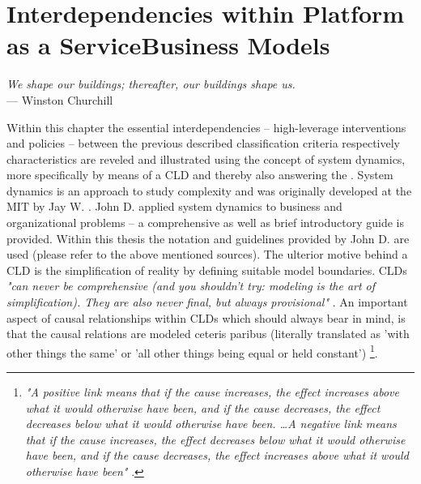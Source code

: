 \chapter[Interdependencies within Platform as a Service Business Models]{Interdependencies within Platform as a Service\protect\linebreak Business Models}\label{ch:cld}

\begin{flushright}{\slshape    
	We shape our buildings; thereafter, our buildings shape us.} \\ \medskip
	--- Winston Churchill
\end{flushright}

Within this chapter the essential interdependencies -- high-leverage interventions and policies -- between the previous described classification criteria respectively characteristics are reveled and illustrated using the concept of system dynamics, more specifically by means of a \ac{CLD} and thereby also answering the . System dynamics is an approach to study complexity and was originally developed at the \ac{MIT} by Jay W. \citet{Forrester1961}. John D. \citeauthor{Sterman2000} applied system dynamics to business and organizational problems -- a comprehensive \citep{Sterman2000} as well as brief \citep{Sterman2001} introductory guide is provided. Within this thesis the notation and guidelines provided by John D. \citeauthor{Sterman2000} are used (please refer to the above mentioned sources). The ulterior motive behind a \ac{CLD} is the simplification of reality by defining suitable model boundaries. \acp{CLD} \textit{"can never be comprehensive (and you shouldn't try: modeling is the art of simplification). They are also never final, but always provisional"} \citep[p. 166]{Sterman2000}. An important aspect of causal relationships within \acp{CLD} which should always bear in mind, is that the causal relations are modeled ceteris paribus (literally translated as 'with other things the same' or 'all other things being equal or held constant') \footnote{\textit{"A positive link means that if the cause increases, the effect increases above what it would otherwise have been, and if the cause decreases, the effect decreases below what it would otherwise have been. \ldots A negative link means that if the cause increases, the effect decreases below what it would otherwise have been, and if the cause decreases, the effect increases above what it would otherwise have been"} \citep[p. 139]{Sterman2000}.}.

